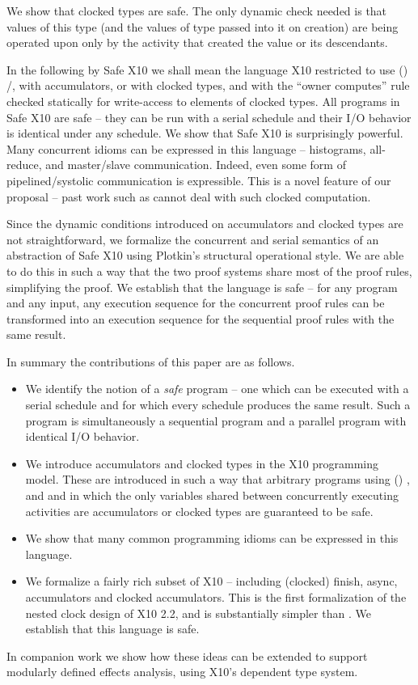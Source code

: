 We show that clocked types are safe. The only dynamic check needed is
that values of this type (and the values of type  passed into
it on creation) are being operated upon only by the activity that
created the value or its descendants.

In the following by Safe X10 we shall mean the language X10 restricted
to use () /,  with
accumulators, or with clocked types, and with the ``owner computes''
rule checked statically for write-access to elements of clocked types.
All programs in Safe X10 are safe -- they can be run with a serial
schedule and their I/O behavior is identical under any schedule.  We
show that Safe X10 is surprisingly powerful. Many concurrent idioms
can be expressed in this language -- histograms, all-reduce, and
master/slave communication.  Indeed, even some form of
pipelined/systolic communication is expressible. This is a novel
feature of our proposal -- past work such as
\cite{Steele:1989:MAP:96709.96731} cannot deal with such clocked
computation.

Since the dynamic conditions introduced on accumulators and clocked
types are not straightforward, we formalize the concurrent and serial
semantics of an abstraction of Safe X10 using Plotkin's structural
operational style. We are able to do this in such a way that the two
proof systems share most of the proof rules, simplifying the proof. We
establish that the language is safe -- for any program and any input,
any execution sequence for the concurrent proof rules can be
transformed into an execution sequence for the sequential proof rules
with the same result.

In summary the contributions of this paper are as follows.

\begin{itemize}
\item We identify the notion of a {\em safe} program -- one which can
  be executed with a serial schedule and for which
  every schedule produces the same result. Such a program is
  simultaneously a sequential program and a parallel program with
  identical I/O behavior.
\item We introduce accumulators and clocked types in the X10
  programming model. These are introduced in such a way that arbitrary
  programs using () ,  and
   and in which the only variables shared between
  concurrently executing activities are accumulators or clocked
  types are guaranteed to be safe.
\item We show that many common programming idioms can be expressed in
  this language.
\item We formalize a fairly rich subset of X10 -- including (clocked)
  finish, async, accumulators and clocked accumulators.  This is the
  first formalization of the nested clock design of X10 2.2, and is
  substantially simpler than \cite{vj-clock}. We establish that this
  language is safe.
\end{itemize}
In companion work we show how these ideas can be extended to support
modularly defined effects analysis, using X10's dependent type system.

